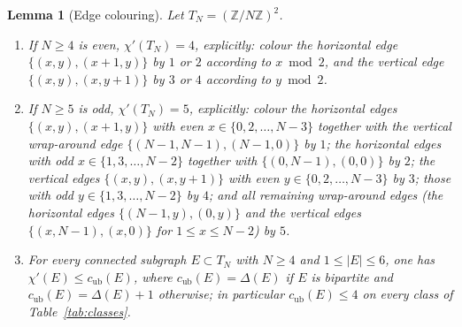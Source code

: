 \documentclass[11pt]{article}
\theoremstyle{plain}
\newtheorem{lemma}{Lemma}
\theoremstyle{definition}
\begin{document}
\begin{lemma}[Edge colouring]\label{lem:edgecolor}
Let $T_N=(\mathbb{Z}/N\mathbb{Z})^{2}$.
\begin{enumerate}
\item\label{it:chi} If $N\ge4$ is even, $\chi'(T_N)=4$, explicitly: colour the
horizontal edge $\{(x,y),(x+1,y)\}$ by $1$ or $2$ according to $x\bmod2$, and the
vertical edge $\{(x,y),(x,y+1)\}$ by $3$ or $4$ according to $y\bmod2$.
\item\label{it:chi5} If $N\ge5$ is odd, $\chi'(T_N)=5$, explicitly: colour the
horizontal edges $\{(x,y),(x+1,y)\}$ with even $x\in\{0,2,\dots,N-3\}$ together with
the vertical wrap-around edge $\{(N-1,N-1),(N-1,0)\}$ by $1$; the horizontal edges
with odd $x\in\{1,3,\dots,N-2\}$ together with $\{(0,N-1),(0,0)\}$ by $2$; the
vertical edges $\{(x,y),(x,y+1)\}$ with even $y\in\{0,2,\dots,N-3\}$ by $3$; those
with odd $y\in\{1,3,\dots,N-2\}$ by $4$; and all remaining wrap-around edges (the
horizontal edges $\{(N-1,y),(0,y)\}$ and the vertical edges $\{(x,N-1),(x,0)\}$ for
$1\le x\le N-2$) by $5$.
\item\label{it:k6} For every connected subgraph $E\subset T_N$ with $N\ge4$ and
$1\le|E|\le6$, one has $\chi'(E)\le c_{\mathrm{ub}}(E)$, where
$c_{\mathrm{ub}}(E)=\Delta(E)$ if $E$ is bipartite and
$c_{\mathrm{ub}}(E)=\Delta(E)+1$ otherwise; in particular $c_{\mathrm{ub}}(E)\le4$
on every class of Table~\ref{tab:classes}.
\end{enumerate}
\end{lemma}
\end{document}
